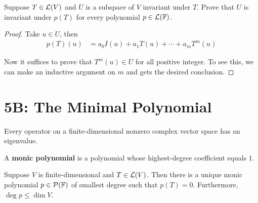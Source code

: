 \documentclass{extarticle}
\begin{document}
\begin{problem}{41}
    Suppose \(T \in \mathcal{L}(V)\) and \(U\) is a subspace of \(V\) invariant under \(T\). Prove that \(U\) is invariant 
    under \(p(T)\) for every polynomial \(p \in \mathcal{L}(\mathbb{F})\).
\end{problem}

\begin{proof}
Take \(u \in U\), then 
\begin{align*}
    p(T)(u) 
    &= a_0I(u) + a_1T(u) + \cdots + a_m T^m(u)
\end{align*}

Now it suffices to prove that \(T^m(u) \in U\) for all positive integer. To see this, we can make an inductive 
argument on \(m\) and gets the desired conclusion.

\end{proof}








\newpage 
\section*{5B: The Minimal Polynomial}

\begin{thm}
    Every operator on a finite-dimensional nonzero complex vector space has an eigenvalue. 
\end{thm}


\begin{definition}
    A \textbf{monic polynomial} is a polynomial whose highest-degree coefficient 
    equals \(1\). 
\end{definition}

\begin{thm}
    Suppose \(V\) is finite-dimensional and \(T \in \mathcal{L}(V)\). Then there is a unique 
    monic polynomial \(p \in \mathcal{P}(\mathbb{F})\) of smallest degree such that \(p(T) = 0\). 
    Furthermore, \(\deg p \leq \dim V\). 
\end{thm}
\end{document}
